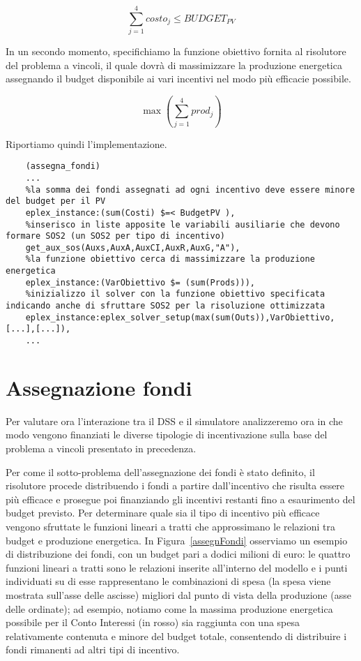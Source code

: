 \begin{equation} \label{eq:vincoloCosti}
	\sum_{j=1}^4 costo_j \leq BUDGET_{PV}
\end{equation}

In un secondo momento, specifichiamo la funzione obiettivo fornita al risolutore del problema a vincoli, il quale dovrà di massimizzare la produzione energetica assegnando il budget disponibile ai vari incentivi nel modo più efficacie possibile.

\begin{equation} \label{eq:vincoloCosti}
	\max ( \sum_{j=1}^4 prod_j )
\end{equation}

Riportiamo quindi l'implementazione.

\begin{lstlisting}
	(assegna_fondi)
	...
	%la somma dei fondi assegnati ad ogni incentivo deve essere minore del budget per il PV
	eplex_instance:(sum(Costi) $=< BudgetPV ),
	%inserisco in liste apposite le variabili ausiliarie che devono formare SOS2 (un SOS2 per tipo di incentivo)
	get_aux_sos(Auxs,AuxA,AuxCI,AuxR,AuxG,"A"),
	%la funzione obiettivo cerca di massimizzare la produzione energetica
	eplex_instance:(VarObiettivo $= (sum(Prods))),
	%inizializzo il solver con la funzione obiettivo specificata indicando anche di sfruttare SOS2 per la risoluzione ottimizzata 
	eplex_instance:eplex_solver_setup(max(sum(Outs)),VarObiettivo,[...],[...]),
	...
\end{lstlisting}

\section{Assegnazione fondi}

Per valutare ora l'interazione tra il DSS e il simulatore analizzeremo ora in che modo vengono finanziati le diverse tipologie di incentivazione sulla base del problema a vincoli presentato in precedenza.

Per come il sotto-problema dell'assegnazione dei fondi è stato definito, il risolutore procede distribuendo i fondi a partire dall'incentivo che risulta essere più efficace e prosegue poi finanziando gli incentivi restanti fino a esaurimento del budget previsto. Per determinare quale sia il tipo di incentivo più efficace vengono sfruttate le funzioni lineari a tratti che approssimano le relazioni tra budget e produzione energetica. In Figura~\ref{assegnFondi} osserviamo un esempio di distribuzione dei fondi, con un budget pari a dodici milioni di euro: le quattro funzioni lineari a tratti sono le relazioni inserite all'interno del modello e i punti individuati su di esse rappresentano le combinazioni di spesa (la spesa viene mostrata sull'asse delle ascisse) migliori dal punto di vista della produzione (asse delle ordinate); ad esempio, notiamo come la massima produzione energetica possibile per il Conto Interessi (in rosso) sia raggiunta con una spesa relativamente contenuta e minore del budget totale, consentendo di distribuire i fondi rimanenti ad altri tipi di incentivo.

